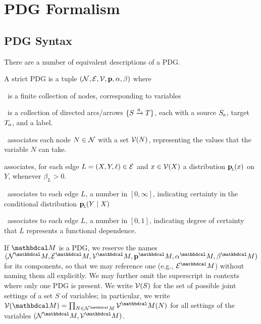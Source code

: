 \documentclass[the-pdg-manual.tex]{subfiles}
\begin{document}
	\section{PDG Formalism}
	\subsection{PDG Syntax}
	
	There are a number of equivalent descriptions of a PDG. 

	\def\pdgvars[#1]{(\N#1, \Ed#1, \V#1, \mat p#1, \alpha#1,\beta#1)}
	\begin{defn}[sPDG]\label{def:sPDG}
		A strict PDG is a tuple $\pdgvars[]$ where
		\begin{description}[nosep]
			\item[$\N$]~is a finite collection of nodes, 
				corresponding to variables
			\item[$\Ar$]~is a collection of directed arcs/arrows $\{\ed aST\}$, each with a source $\Src a$, target $\Tgt a$, and a label.
			\item[$\V$]~associates each node $N \in \mathcal N$ with a set $\mathcal V(N)$,
			representing the values that the variable $N$ can take. 
			\item[$\mathbf p$] associates, for each edge $L = (X,Y, \ell) \in \mathcal E$ and $x \in \mathcal V(X)$ a distribution $\mathbf{p}_{\!_{L}\!}(x)$ on $Y$, whenever $\beta_L > 0$.
			\item[$\bbeta$]~associates to each edge $L$, a number in $[0,\infty]$, indicating certainty in the conditional distribution $\mathbf{p}_{\!_{L}\!}(Y \mid X)$ 
			\item[$\balpha$]~associates to each edge $L$, a number in $[0,1]$, indicating degree of certainty that $L$ represents a functional dependence.
			\qedhere
		\end{description}
	\end{defn}

	If $\dg M$ is a PDG, we reserve the names $\pdgvars[^\dg M]$
	for its components, so that we may reference one (e.g.,
	$\Ed^\dg M$) without naming them all explicitly. We may further omit the superscript in contexts where only one PDG is present. 
	We write $\mathcal V(S)$ for the set of possible joint settings of a set $S$
	of variables; in particular, 
	we write $\V(\dg M)
	= \prod_{N \in \N^\dg M} \V^\dg M(N)$
	for all settings of the variables $(\N^\dg M, \V^\dg M)$.
	
\end{document}
